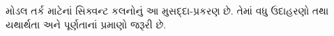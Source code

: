 \documentclass[../../../include/open-logic-chapter]{subfiles}
\begin{document}
\begin{editorial}
  મોડલ તર્ક માટેનાં સિક્વન્ટ કલનોનું આ મુસદ્દા-પ્રકરણ છે.
  તેમાં વધુ ઉદાહરણો તથા યથાર્થતા અને પૂર્ણતાનાં પ્રમાણો
  જરૂરી છે.
\end{editorial}


\OLEndChapterHook
\end{document}
